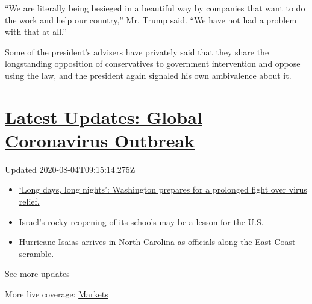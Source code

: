 ``We are literally being besieged in a beautiful way by companies that
want to do the work and help our country,'' Mr. Trump said. ``We have
not had a problem with that at all.''

Some of the president's advisers have privately said that they share the
longstanding opposition of conservatives to government intervention and
oppose using the law, and the president again signaled his own
ambivalence about it.

\hypertarget{latest-updates-global-coronavirus-outbreak}{%
\section{\texorpdfstring{\href{https://www.nytimes3xbfgragh.onion/2020/08/04/world/coronavirus-covid-19.html?action=click\&pgtype=Article\&state=default\&region=MAIN_CONTENT_1\&context=storylines_live_updates}{Latest
Updates: Global Coronavirus
Outbreak}}{Latest Updates: Global Coronavirus Outbreak}}\label{latest-updates-global-coronavirus-outbreak}}

Updated 2020-08-04T09:15:14.275Z

\begin{itemize}
\tightlist
\item
  \href{https://www.nytimes3xbfgragh.onion/2020/08/04/world/coronavirus-covid-19.html?action=click\&pgtype=Article\&state=default\&region=MAIN_CONTENT_1\&context=storylines_live_updates\#link-6b644638}{`Long
  days, long nights': Washington prepares for a prolonged fight over
  virus relief.}
\item
  \href{https://www.nytimes3xbfgragh.onion/2020/08/04/world/coronavirus-covid-19.html?action=click\&pgtype=Article\&state=default\&region=MAIN_CONTENT_1\&context=storylines_live_updates\#link-7af9fca0}{Israel's
  rocky reopening of its schools may be a lesson for the U.S.}
\item
  \href{https://www.nytimes3xbfgragh.onion/2020/08/04/world/coronavirus-covid-19.html?action=click\&pgtype=Article\&state=default\&region=MAIN_CONTENT_1\&context=storylines_live_updates\#link-33bf9168}{Hurricane
  Isaias arrives in North Carolina as officials along the East Coast
  scramble.}
\end{itemize}

\href{https://www.nytimes3xbfgragh.onion/2020/08/04/world/coronavirus-covid-19.html?action=click\&pgtype=Article\&state=default\&region=MAIN_CONTENT_1\&context=storylines_live_updates}{See
more updates}

More live coverage:
\href{https://www.nytimes3xbfgragh.onion/live/2020/08/03/business/stock-market-today-coronavirus?action=click\&pgtype=Article\&state=default\&region=MAIN_CONTENT_1\&context=storylines_live_updates}{Markets}

